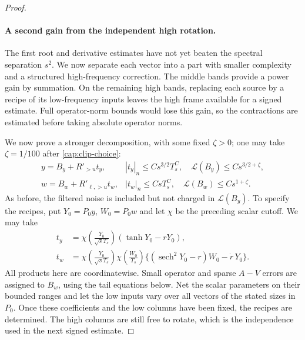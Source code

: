 \begin{proof}
\paragraph{A second gain from the independent high rotation.}
The first root and derivative estimates have not yet beaten the spectral
separation $s^2$. We now separate each vector into a part with smaller complexity
and a structured high-frequency correction. The middle bands provide a
power gain by summation. On the remaining high bands, replacing each source
by a recipe of its low-frequency inputs leaves the high frame available for
a signed estimate. Full operator-norm bounds would lose this gain, so the
contractions are estimated before taking absolute operator norms.

  We now prove a stronger decomposition,
with some fixed $\zeta>0$; one may take $\zeta=1/100$ after
\eqref{cap:clip-choice}:
\begin{equation}\label{cap:refined-decomposition}
 \begin{array}{ll}
 y=B_y+R'_{>u}t_y,&
   |t_y|_n\le Cs^{3/2}T_s^C,\quad
       \mathscr L(B_y)\le Cs^{3/2+\zeta},\\
 w=B_w+R'_{\ell,>u}t_w,&
   |t_w|_n\le CsT_s^C,\quad
       \mathscr L(B_w)\le Cs^{1+\zeta}.
 \end{array}
\end{equation}
As before, the filtered noise is included but not charged in $\mathscr
L(B_y)$. To specify the recipes, put $Y_0=P_0y$, $W_0=P_0w$ and let $\chi$ be
the preceding scalar cutoff. We may take
\begin{equation}\label{cap:low-input-recipes}
 \begin{split}
 t_y&=\chi\left(\frac{Y_0}{\sqrt sT_s}\right)
                         (\tanh Y_0-rY_0),\\
 t_w&=\chi\left(\frac{Y_0}{\sqrt sT_s}\right)
       \chi\left(\frac{W_0}{T_s}\right)
       \{(\operatorname{sech}^2Y_0-r)W_0-\dot r\,Y_0\}.
 \end{split}
\end{equation}
All products here are coordinatewise. Small operator and sparse $A-V$ errors
are assigned to $B_w$, using the tail equations below. Net the scalar
parameters on their bounded ranges and let the low inputs vary over all
vectors of the stated sizes in $P_0$. Once these coefficients and the low
columns have been fixed, the recipes are determined. The high columns are
still free to rotate, which is the independence used in the next signed
estimate.


\end{proof}
